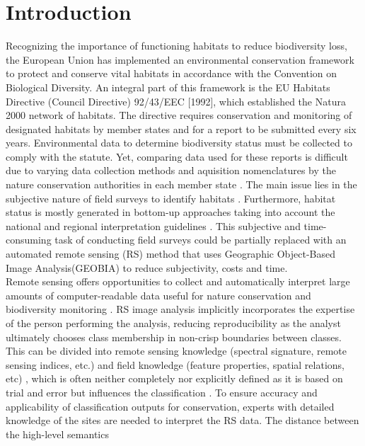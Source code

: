 \documentclass[authoryear, review,12pt,number]{elsarticle}
\begin{document}
\section{Introduction}
Recognizing the importance of functioning habitats to reduce biodiversity loss,
the European Union has implemented an environmental conservation framework to
protect and conserve vital habitats in accordance with the Convention on
Biological Diversity. An integral part of this framework is the EU Habitats
Directive (Council Directive) 92/43/EEC [1992], which established the Natura
2000 network of habitats. The directive requires conservation and monitoring of
designated habitats by member states and for a report to be submitted every six
years. Environmental data to determine biodiversity status must be collected to
comply with the statute. Yet, comparing data used for these reports is difficult
due to varying data collection methods and aquisition nomenclatures by the
nature conservation authorities in each member state \citep{VandenBorre2011}.
The main issue lies in the subjective nature of field surveys to identify
habitats \citep{Cherrill1999, Cherrill1999a, Hearn_2011, Nieland2015}.
Furthermore, habitat status is mostly generated in bottom-up approaches taking
into account the national and regional interpretation guidelines
\citep{VandenBorre2011, INSPIREdataspecs}. This subjective and time-consuming
task of conducting field surveys could be partially replaced with an automated
remote sensing (RS) method that uses Geographic Object-Based Image
Analysis(GEOBIA) to reduce subjectivity, costs and time.
\\
Remote sensing offers opportunities to collect and automatically interpret large
amounts of computer-readable data useful for nature conservation and
biodiversity monitoring \citep{Corbane2015, VandenBorre2011, Mayer2011}. RS
image analysis implicitly incorporates the expertise of the person performing
the analysis, reducing reproducibility as the analyst ultimately chooses class
membership in non-crisp boundaries between classes. This can be divided into
remote sensing knowledge (spectral signature, remote sensing indices, etc.) and
field knowledge (feature properties, spatial relations, etc)
\citep{Andres2013a}, which is often neither completely nor explicitly defined as
it is based on trial and error but influences the classification
\citep{Arvor2013}. To ensure accuracy and applicability of classification
outputs for conservation, experts with detailed knowledge of the sites are
needed to interpret the RS data. The distance between the high-level semantics
\end{document}
